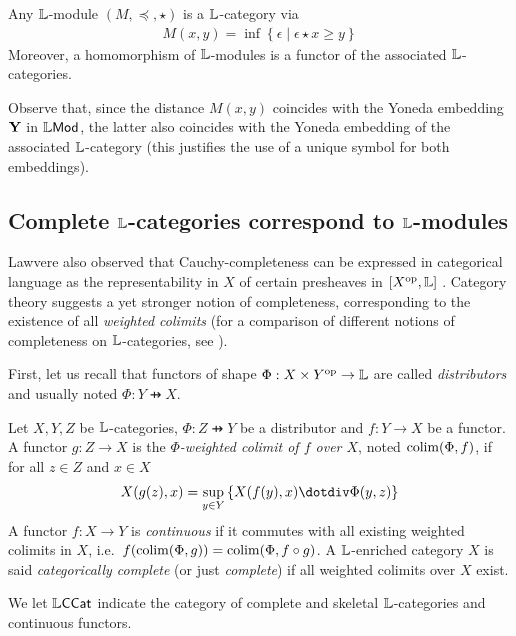 \begin{proposition}
Any $\mathbb{L}$-module $(M,\preceq, \star)$ is a $\mathbb{L}$-category via
\begin{align}
M(x,y) = \inf\left\{ \epsilon \mid \epsilon \star x\geq y\right\}
\end{align}
Moreover, a homomorphism of $\mathbb{L}$-modules is a functor of the associated $\mathbb{L}$-categories.
\end{proposition}

Observe that, since the distance $M(x,y)$ coincides with the Yoneda embedding $\mathbf{Y}$ in $\mathbb{L}\mathsf{Mod}$, the latter also coincides with the Yoneda embedding of the associated $\mathbb{L}$-category (this justifies the use of a unique symbol for both embeddings).


\subsection{Complete $\mathbb{L}$-categories correspond to $\mathbb{L}$-modules}

Lawvere also observed that Cauchy-completeness can be expressed in categorical language as the representability in $X$ of certain presheaves in $[X^{\mathrm{op}},\mathbb{L}]$ \cite{Lawvere1973, Rutten1998}. Category theory suggests a yet stronger notion of completeness, corresponding to the existence of all \emph{weighted colimits} (for a comparison of different notions of completeness on $\mathbb{L}$-categories, see \cite{Willerton2013, Rutten1998}).

First, let us recall that functors of shape $\Phi: X\times Y^{\mathrm{op}}\to \mathbb{L}$ are called \emph{distributors} and usually noted $\Phi: Y \pfun X$.


\begin{definition}
Let $X,Y,Z$ be $\mathbb{L}$-categories,
$\Phi: Z\pfun Y$ be a distributor and  $f:Y\to X$ be a functor.
A functor $g:Z\to X$ is the \emph{$\Phi$-weighted colimit of $f$ over $X$}, noted $\mathrm{colim}(\Phi,f)$, if for all $z\in Z$ and $x\in X$
\begin{align}
X(g(z),x)= \sup_{y\in Y}\left\{X(f(y),x)\menus \Phi(y,z)\right\}
\end{align} 
A functor $f:X\to Y$ is \emph{continuous} if it commutes with all existing weighted colimits in $X$, i.e.~$f(\mathrm{colim}(\Phi,g))=\mathrm{colim}(\Phi,f\circ g)$. A $\mathbb{L}$-enriched category 
$X$ is said \emph{categorically complete} (or just \emph{complete}) if all weighted colimits over $X$ exist. 
\end{definition}

We let $\mathbb{L}\mathsf{CCat}$ indicate the category of complete and skeletal $\mathbb{L}$-categories and continuous functors. 

